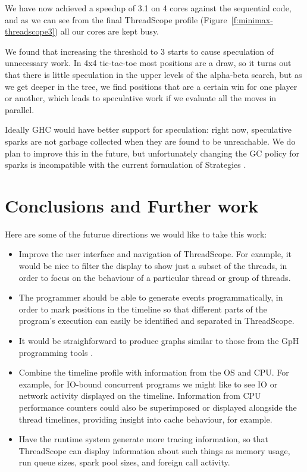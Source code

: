 \documentclass[twocolumn,9pt]{sigplanconf}
\let\cite=\citep
\begin{document}
We have now achieved a speedup of 3.1 on 4 cores against the
sequential code, and as we can see from the final ThreadScope profile
(Figure~\ref{f:minimax-threadscope3}) all our cores are kept busy.

We found that increasing the threshold to 3 starts to cause
speculation of unnecessary work.  In 4x4 tic-tac-toe most positions
are a draw, so it turns out that there is little speculation in the
upper levels of the alpha-beta search, but as we get deeper in the
tree, we find positions that are a certain win for one player or
another, which leads to speculative work if we evaluate all the moves
in parallel.  

Ideally GHC would have better support for speculation: right now,
speculative sparks are not garbage collected when they are found to be
unreachable.  We do plan to improve this in the future, but
unfortunately changing the GC policy for sparks is incompatible with
the current formulation of Strategies \cite{multicore-ghc}.



\section{Conclusions and Further work}
\label{s:conclusion}

Here are some of the futurue directions we would like to take this
work:

\begin{itemize}
\item Improve the user interface and navigation of ThreadScope.  For
  example, it would be nice to filter the display to show just a
  subset of the threads, in order to focus on the behaviour of a
  particular thread or group of threads.

\item The programmer should be able to generate events
  programmatically, in order to mark positions in the timeline so that
  different parts of the program's execution can easily be identified
  and separated in ThreadScope.

\item It would be straighforward to produce graphs similar to those
  from the GpH programming tools \cite{gph}.

\item Combine the timeline profile with information from the OS and
  CPU.  For example, for IO-bound concurrent programs we might like to
  see IO or network activity displayed on the timeline.  Information
  from CPU performance counters could also be superimposed or
  displayed alongside the thread timelines, providing insight into
  cache behaviour, for example.

\item Have the runtime system generate more tracing information, so
  that ThreadScope can display information about such things as memory
  usage, run queue sizes, spark pool sizes, and foreign call activity.
\end{itemize}

{\small


}
\end{document}
